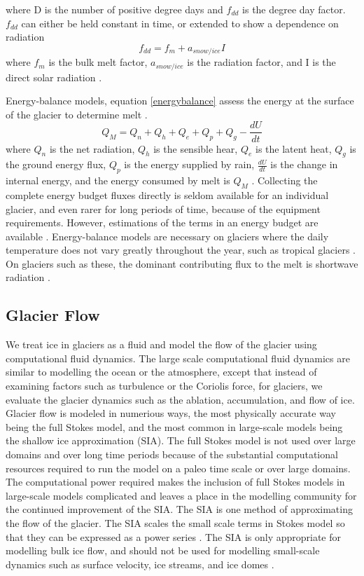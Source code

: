\documentclass{article}
\begin{document}
where D is the number of positive degree days and $f_{dd}$ is the degree day factor. $f_{dd}$ can either be held constant in time, or extended to show a dependence on radiation
\begin{equation}
f_{dd} = f_m+ a_{snow/ice}I
\end{equation}
 where $f_m$ is the bulk melt factor, $a_{snow/ice}$ is the radiation factor, and I is the direct solar radiation \citep{Clarke2015}. 

Energy-balance models, equation \ref{energybalance} assess the energy at the surface of the glacier to determine melt \citep{Hock2005}. 
\begin{equation}\label{energybalance}
Q_M = Q_n+Q_h+Q_e+Q_p+Q_g-\frac{dU}{dt}
\end{equation}
where $Q_n$ is the net radiation, $Q_h$ is the sensible hear, $Q_e$ is the latent heat, $Q_g$ is the ground energy flux, $Q_p$ is the energy supplied by rain, $\frac{dU}{dt}$ is the change in internal energy, and the energy consumed by melt is $Q_M$ \citep{Hock2005, Hooke2013}.  Collecting the complete energy budget fluxes directly is seldom available for an individual glacier, and even rarer for long periods of time, because of the equipment requirements. However, estimations of the terms in an energy budget are available \citep{Hock2005}. Energy-balance models are necessary on glaciers where the daily temperature does not vary greatly throughout the year, such as tropical glaciers \citep{Sicart2008}. On glaciers such as these, the dominant contributing flux to the melt is shortwave radiation \citep{Pradhananga2020, Sicart2008}.

\subsection{Glacier Flow}
We treat ice in glaciers as a fluid and model the flow of the glacier using computational fluid dynamics. The large scale computational fluid dynamics are similar to modelling the ocean or the atmosphere, except that instead of examining factors such as turbulence or the Coriolis force, for glaciers, we evaluate the glacier dynamics such as the ablation, accumulation, and flow of ice. Glacier flow is modeled in numerious ways, the most physically accurate way being the full Stokes model, and the most common in large-scale models being the shallow ice approximation (SIA). The full Stokes model is not used over large domains and over long time periods because of the substantial computational resources required to run the model on a paleo time scale or over large domains. The computational power required makes the inclusion of full Stokes models in large-scale models complicated and leaves a place in the modelling community for the continued improvement of the SIA. The SIA is one method of approximating the flow of the glacier. The SIA scales the small scale terms in Stokes model so that they can be expressed as a power series \citep{Kirchner2016, Emmanuel2004}. The SIA is only appropriate for modelling bulk ice flow, and should not be used for modelling small-scale dynamics such as surface velocity, ice streams,  and ice domes \citep{AHLKRONA2016,LEMEUR2004}.
\end{document}
